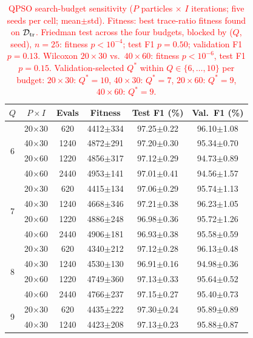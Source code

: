 \begin{table}[!t]
\centering
\scriptsize
\caption{\textcolor{red}{QPSO search-budget sensitivity ($P$ particles $\times$ $I$ iterations;
five seeds per cell; mean$\pm$std). Fitness: best trace-ratio fitness found on $\mathcal{D}_{\rm tr}$.
Friedman test across the four budgets, blocked by ($Q$, seed), $n{=}25$: fitness $p{<}10^{-4}$;
test F1 $p{=}0.50$; validation F1 $p{=}0.13$. Wilcoxon $20{\times}30$ vs.\ $40{\times}60$: fitness
$p{<}10^{-6}$, test F1 $p{=}0.15$. Validation-selected $Q^*$ within $Q\in\{6,\dots,10\}$ per budget: $20{\times}30$: $Q^*{=}10$, $40{\times}30$: $Q^*{=}7$, $20{\times}60$: $Q^*{=}9$, $40{\times}60$: $Q^*{=}9$.}}
\label{tab:budget_sensitivity}
\color{red}
\setlength{\tabcolsep}{3pt}
\begin{tabular}{cccccc}
\hline\toprule
$Q$ & $P{\times}I$ & Evals & Fitness & Test F1 (\%) & Val.\ F1 (\%) \\
\hline\toprule
\multirow{4}{*}{6} & 20$\times$30 & 620 & 4412$\pm$334 & 97.25$\pm$0.22 & 96.10$\pm$1.08 \\
 & 40$\times$30 & 1240 & 4872$\pm$291 & 97.20$\pm$0.30 & 95.34$\pm$0.70 \\
 & 20$\times$60 & 1220 & 4856$\pm$317 & 97.12$\pm$0.29 & 94.73$\pm$0.89 \\
 & 40$\times$60 & 2440 & 4953$\pm$141 & 97.01$\pm$0.41 & 94.56$\pm$1.57 \\
\midrule
\multirow{4}{*}{7} & 20$\times$30 & 620 & 4415$\pm$134 & 97.06$\pm$0.29 & 95.74$\pm$1.13 \\
 & 40$\times$30 & 1240 & 4668$\pm$346 & 97.21$\pm$0.38 & 96.23$\pm$1.05 \\
 & 20$\times$60 & 1220 & 4886$\pm$248 & 96.98$\pm$0.36 & 95.72$\pm$1.26 \\
 & 40$\times$60 & 2440 & 4906$\pm$181 & 96.93$\pm$0.38 & 95.58$\pm$0.59 \\
\midrule
\multirow{4}{*}{8} & 20$\times$30 & 620 & 4340$\pm$212 & 97.12$\pm$0.28 & 96.13$\pm$0.48 \\
 & 40$\times$30 & 1240 & 4530$\pm$130 & 96.91$\pm$0.16 & 94.98$\pm$0.36 \\
 & 20$\times$60 & 1220 & 4749$\pm$360 & 97.13$\pm$0.33 & 95.64$\pm$0.52 \\
 & 40$\times$60 & 2440 & 4766$\pm$237 & 97.15$\pm$0.27 & 95.40$\pm$0.73 \\
\midrule
\multirow{4}{*}{9} & 20$\times$30 & 620 & 4435$\pm$222 & 97.30$\pm$0.24 & 95.89$\pm$0.89 \\
 & 40$\times$30 & 1240 & 4423$\pm$208 & 97.13$\pm$0.23 & 95.88$\pm$0.87 \\

\end{tabular}
\end{table}
